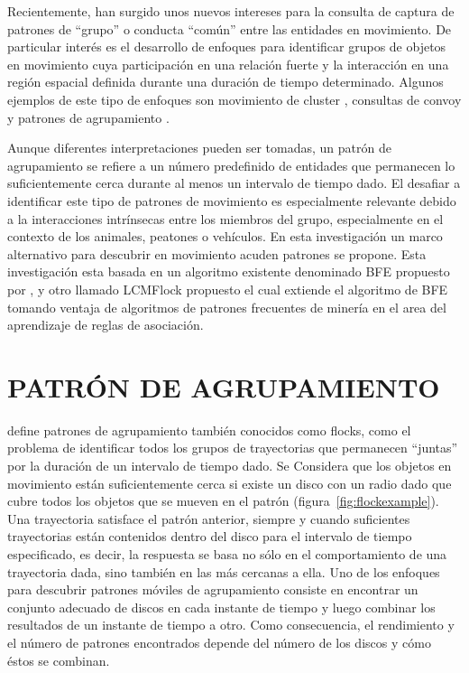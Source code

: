 Recientemente, han surgido unos nuevos intereses para la consulta de captura de patrones de ``grupo'' 
o conducta ``común'' entre las entidades en movimiento. De particular interés es el desarrollo 
de enfoques para identificar grupos de objetos en movimiento cuya participación en una relación 
fuerte y la interacción en una región espacial definida durante una duración de tiempo determinado. 
Algunos ejemplos de este tipo de enfoques son movimiento de cluster \cite{kalnis2005discovering} 
\cite{jensen2007continuous}, consultas de convoy \cite{jeung2008discovery-1} y patrones de 
agrupamiento \cite{gudmundsson2006computing} \cite{benkert2008reporting} \cite{VieiraT13} 
\cite{turdu2014}. 

Aunque diferentes interpretaciones pueden ser tomadas, un patrón de agrupamiento se refiere a un 
número predefinido de entidades que permanecen lo suficientemente cerca durante al menos un 
intervalo de tiempo dado. El desafiar a identificar este tipo de patrones de movimiento es 
especialmente relevante debido a la interacciones intrínsecas entre los miembros del grupo, 
especialmente en el contexto de los animales, peatones o vehículos. En esta investigación un marco 
alternativo para descubrir en movimiento  acuden patrones se propone. Esta investigación esta 
basada en un algoritmo existente denominado BFE propuesto por \cite{VieiraT13}, y otro 
llamado LCMFlock propuesto \cite{turdu2014} el cual extiende el algoritmo de BFE tomando ventaja de 
algoritmos de patrones frecuentes de minería en el area del aprendizaje de reglas de asociación.


\section{PATRÓN DE AGRUPAMIENTO}

\cite{vieira2009line} 
define patrones de agrupamiento también conocidos como flocks, como el problema de 
identificar todos los grupos 
de trayectorias que permanecen
``juntas'' por la duración de un intervalo de tiempo dado. Se Considera que los objetos en 
movimiento están suficientemente
cerca si existe un disco con un
radio dado que cubre todos los objetos que se mueven en el patrón 
(figura~\ref{fig:flockexample}). Una trayectoria satisface el 
patrón anterior, siempre y cuando suficientes trayectorias están contenidos 
dentro del disco para el intervalo de
tiempo especificado, es decir, la respuesta se basa no sólo en el comportamiento 
de una trayectoria dada, sino
también en las más cercanas a ella. Uno de los enfoques para descubrir patrones 
móviles de agrupamiento consiste
en encontrar un conjunto adecuado de discos en cada instante de tiempo y luego 
combinar los resultados de un 
instante de tiempo a otro. Como consecuencia, el rendimiento y el número de 
patrones encontrados depende del número
de los discos y cómo éstos se combinan.

